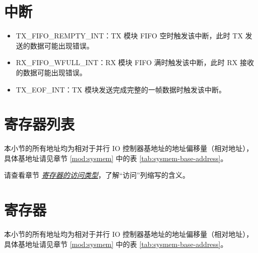 \documentclass[main\_\_CN.tex]{subfiles}
\begin{document}
\section{中断} \label{sec:parlio-interrupts}


\begin{itemize}
\item \label{int:TXFIFOREMPTYINT}TX\_FIFO\_REMPTY\_INT：TX 模块 FIFO 空时触发该中断，此时 TX 发送的数据可能出现错误。
\item \label{int:RXFIFOWFULLINT}RX\_FIFO\_WFULL\_INT：RX 模块 FIFO 满时触发该中断，此时 RX 接收的数据可能出现错误。
\item \label{int:TXEOFINT}TX\_EOF\_INT：TX 模块发送完成完整的一帧数据时触发该中断。
\end{itemize}





\clearpage
\hypertarget{parlio-reg-summ}{}
\section{寄存器列表}
\label{sec:parlio-reg-summ}

本小节的所有地址均为相对于并行 IO 控制器基地址的地址偏移量（相对地址），具体基地址请见章节 \ref{mod:sysmem} \textit{} 中的表 \ref{tab:sysmem-base-address}。

请查看章节 \hyperref[glossary-access-types]{\textit{寄存器的访问类型}}，了解“访问”列缩写的含义。






\clearpage
\section{寄存器}

本小节的所有地址均为相对于并行 IO 控制器基地址的地址偏移量（相对地址），具体基地址请见章节 \ref{mod:sysmem} \textit{} 中的表 \ref{tab:sysmem-base-address}。


\end{document}
